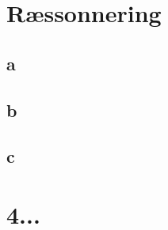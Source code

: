 \documentclass{article}
\begin{document}
\section{Ræssonnering}

\subsection{a}
\subsection{b}
\subsection{c}

\section{4...}
\end{document}

